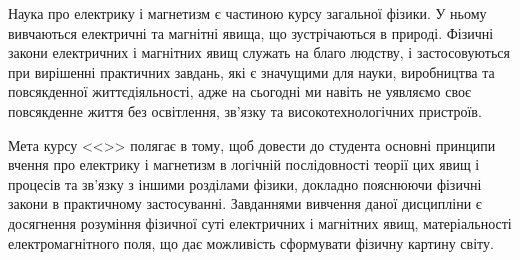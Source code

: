 \documentclass{Syllabus}
\begin{document}
Наука про електрику і магнетизм є частиною курсу загальної фізики. У ньому вивчаються електричні та магнітні явища, що зустрічаються в природі. Фізичні закони електричних і магнітних явищ служать на благо людству, і застосовуються при вирішенні практичних завдань, які є значущими для науки, виробництва та повсякденної життєдіяльності, адже на сьогодні ми навіть не уявляємо своє повсякденне життя без освітлення, зв'язку та високотехнологічних пристроїв.

Мета курсу <<\discipline>> полягає в тому, щоб довести до студента основні принципи вчення про електрику і магнетизм в логічній послідовності теорії цих явищ і процесів та зв'язку з іншими розділами фізики, докладно пояснюючи фізичні закони в практичному застосуванні. Завданнями вивчення даної дисципліни є досягнення розуміння фізичної суті електричних і магнітних явищ, матеріальності електромагнітного поля, що дає можливість сформувати фізичну картину світу.

\end{document}
